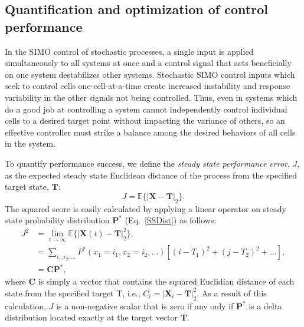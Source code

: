 \documentclass[12pt]{iopart}
\begin{document}


\subsection{Quantification and optimization of control performance}\label{sec:Quantification}
In the SIMO control of stochastic processes, a single input is applied simultaneously to all systems at once and a control signal that acts beneficially on one system destabilizes other systems. Stochastic SIMO control inputs which seek to control cells one-cell-at-a-time create increased instability and response variability in the other signals not being controlled.
Thus, even in systems which do a good job at controlling a system cannot independently control individual cells to a desired target point without impacting the variance of others, so an effective controller must strike a balance among the desired behaviors of all cells in the system. 

To quantify performance success, we define the {\em steady state performance error}, $J$, as the expected steady state Euclidean distance of the process from the specified target state, $\mathbf{T}$:
 \begin{equation}
 J = \mathbb{E}\{|\mathbf{X}-\mathbf{T}|_2\}.
 \end{equation}
The squared score is easily calculated by applying a linear operator on steady state probability distribution $\mathbf{P}^*$ (Eq.\ \ref{SSDist}) as follows:
\begin{eqnarray}
J^2&= \lim_{t\rightarrow \infty}\mathbb{E}\{|\mathbf{X}(t)-\mathbf{T}|_2^2\}, \nonumber \\ 
&=\sum_{i_1,i_2,\ldots} P^*(x_1=i_1,x_2=i_2,\ldots) \left[(i- T_1)^2 + (j- T_2)^2 +\ldots\right],\nonumber  \\
&=\mathbf{C}\mathbf{P}^*,
\label{Euclid}
\end{eqnarray}
where $\mathbf{C}$ is simply a vector that contains the squared Euclidian distance of each state from the specified target T, i.e., $C_i = |\mathbf{X}_i-\mathbf{T}|_2^2$. 
As a result of this calculation, $J$ is a non-negative scalar that is zero if any only if $\mathbf{P}^*$ is a delta distribution located exactly at the target vector $\mathbf{T}$.
\end{document}
